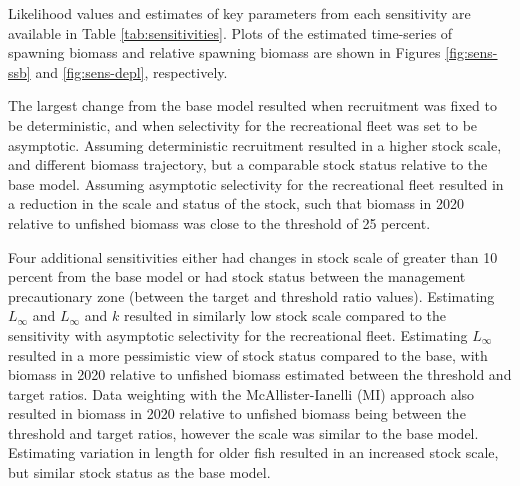 \documentclass[11pt,
  english,
  a4paper,
]{article}
\begin{document}

Likelihood values and estimates of key parameters from each sensitivity are available in Table \ref{tab:sensitivities}. Plots of the estimated time-series of spawning biomass and relative spawning biomass are shown in Figures \ref{fig:sens-ssb} and \ref{fig:sens-depl}, respectively.

\leavevmode\tagmcend\tagstructend\par


The largest change from the base model resulted when recruitment was fixed to be deterministic, and when selectivity for the recreational fleet was set to be asymptotic. Assuming deterministic recruitment resulted in a higher stock scale, and different biomass trajectory, but a comparable stock status relative to the base model. Assuming asymptotic selectivity for the recreational fleet resulted in a reduction in the scale and status of the stock, such that biomass in 2020 relative to unfished biomass was close to the threshold of 25 percent.

\leavevmode\tagmcend\tagstructend\par


Four additional sensitivities either had changes in stock scale of greater than 10 percent from the base model or had stock status between the management precautionary zone (between the target and threshold ratio values). Estimating {\(L_{\infty}\)\leavevmode\tagmcend\tagstructend} and {\(L_{\infty}\)\leavevmode\tagmcend\tagstructend} and {\(k\)\leavevmode\tagmcend\tagstructend} resulted in similarly low stock scale compared to the sensitivity with asymptotic selectivity for the recreational fleet. Estimating {\(L_{\infty}\)\leavevmode\tagmcend\tagstructend} resulted in a more pessimistic view of stock status compared to the base, with biomass in 2020 relative to unfished biomass estimated between the threshold and target ratios. Data weighting with the McAllister-Ianelli (MI) approach also resulted in biomass in 2020 relative to unfished biomass being between the threshold and target ratios, however the scale was similar to the base model. Estimating variation in length for older fish resulted in an increased stock scale, but similar stock status as the base model.
\end{document}
